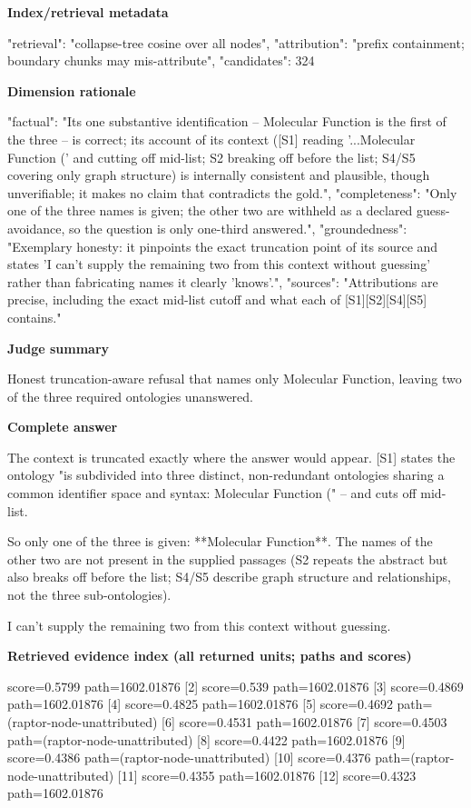 \documentclass[10pt]{article}
\begin{document}
\textbf{Index/retrieval metadata}
\begin{EvidenceText}
{
  "retrieval": "collapse-tree cosine over all nodes",
  "attribution": "prefix containment; boundary chunks may mis-attribute",
  "candidates": 324
}
\end{EvidenceText}

\textbf{Dimension rationale}
\begin{EvidenceText}
{
  "factual": "Its one substantive identification -- Molecular Function is the first of the three -- is correct; its account of its context ([S1] reading '...Molecular Function (' and cutting off mid-list; S2 breaking off before the list; S4/S5 covering only graph structure) is internally consistent and plausible, though unverifiable; it makes no claim that contradicts the gold.",
  "completeness": "Only one of the three names is given; the other two are withheld as a declared guess-avoidance, so the question is only one-third answered.",
  "groundedness": "Exemplary honesty: it pinpoints the exact truncation point of its source and states 'I can't supply the remaining two from this context without guessing' rather than fabricating names it clearly 'knows'.",
  "sources": "Attributions are precise, including the exact mid-list cutoff and what each of [S1][S2][S4][S5] contains."
}
\end{EvidenceText}

\textbf{Judge summary}
\begin{EvidenceText}
Honest truncation-aware refusal that names only Molecular Function, leaving two of the three required ontologies unanswered.
\end{EvidenceText}

\textbf{Complete answer}
\begin{AnswerText}
The context is truncated exactly where the answer would appear. [S1] states the ontology "is subdivided into three distinct, non-redundant ontologies sharing a common identifier space and syntax: Molecular Function (" -- and cuts off mid-list.

So only one of the three is given: **Molecular Function**. The names of the other two are not present in the supplied passages (S2 repeats the abstract but also breaks off before the list; S4/S5 describe graph structure and relationships, not the three sub-ontologies).

I can't supply the remaining two from this context without guessing.
\end{AnswerText}

\textbf{Retrieved evidence index (all returned units; paths and scores) }
\begin{EvidenceText}
[1] score=0.5799 path=1602.01876
[2] score=0.539 path=1602.01876
[3] score=0.4869 path=1602.01876
[4] score=0.4825 path=1602.01876
[5] score=0.4692 path=(raptor-node-unattributed)
[6] score=0.4531 path=1602.01876
[7] score=0.4503 path=(raptor-node-unattributed)
[8] score=0.4422 path=1602.01876
[9] score=0.4386 path=(raptor-node-unattributed)
[10] score=0.4376 path=(raptor-node-unattributed)
[11] score=0.4355 path=1602.01876
[12] score=0.4323 path=1602.01876
\end{EvidenceText}
\end{document}
